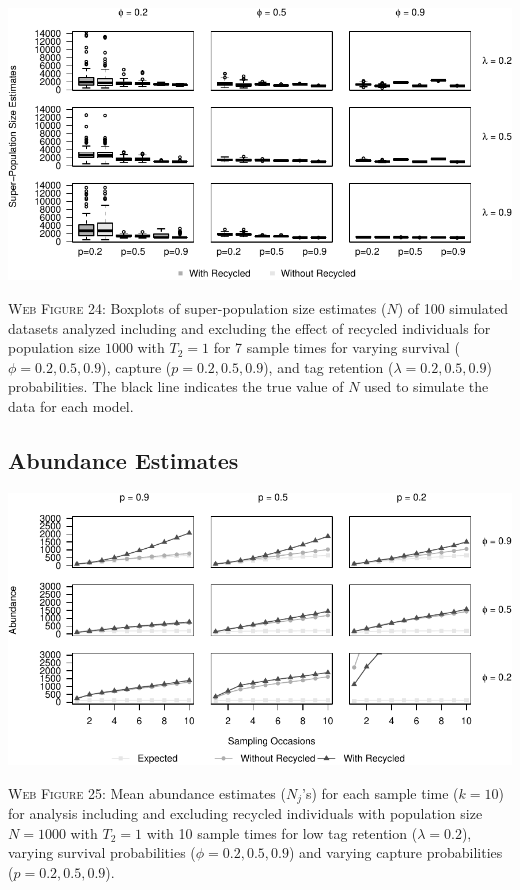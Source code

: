 \documentclass[]{article}
\begin{document}
\includegraphics{Appendix_BW_files/figure-latex/figure24_superN_GJSTL6-1.pdf}

\textsc{Web Figure 24:} Boxplots of super-population size estimates
(\(N\)) of 100 simulated datasets analyzed including and excluding the effect
of recycled individuals for population size \(1000\) with \(T_2=1\) for
7 sample times for varying survival (\(\phi=0.2,0.5,0.9\)), capture
(\(p=0.2,0.5,0.9\)), and tag retention (\(\lambda=0.2,0.5,0.9\))
probabilities. The black line indicates the true value of \(N\) used to
simulate the data for each model.

\newpage

\subsection{Abundance Estimates}\label{abundance-estimates}

\includegraphics{Appendix_BW_files/figure-latex/25_abundance_L_GJSTL1-1.pdf}

\textsc{Web Figure 25:} Mean abundance estimates (\(N_j\)'s) for each
sample time (\(k=10\)) for analysis including and excluding recycled
individuals with population size \(N=1000\) with \(T_2=1\) with 10 sample times for low tag retention (\(\lambda=0.2\)), varying survival
probabilities (\(\phi=0.2,0.5,0.9\)) and varying capture probabilities
(\(p=0.2,0.5,0.9\)).
\end{document}
